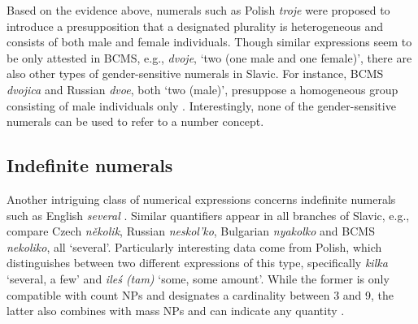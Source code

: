 \documentclass[output=paper]{langscibook}
\begin{document}
	\ea\label{ex:gender-polish} \label{ex:gender-polish-trzech}
	\label{ex:gender-polish-trzy}
	\label{ex:gender-polish-troje}
	\z
	\z

    \noindent Based on the evidence above, numerals such as Polish \textit{troje} were proposed to introduce a presupposition that a designated plurality is heterogeneous and consists of both male and female individuals. Though similar expressions seem to be only attested in BCMS, e.g., \textit{dvoje}, `two (one male and one female)', there are also other types of gender-sensitive numerals in Slavic. For instance, BCMS \textit{dvojica} and Russian \textit{dvoe}, both `two (male)', presuppose a homogeneous group consisting of male individuals only \citep{kim2009structure,lucic2015observations,khrizman2020cardinal}. Interestingly, none of the gender-sensitive numerals can be used to refer to a number concept.
	
	\subsection{Indefinite numerals}\label{sec:indefinite-numerals}
	
	Another intriguing class of numerical expressions concerns indefinite numerals such as English \textit{several} \citep{kayne2007several}. Similar quantifiers appear in all branches of Slavic, e.g., compare Czech \textit{několik}, Russian \textit{neskol'ko}, Bulgarian \textit{nyakolko} and BCMS \textit{nekoliko}, all `several'. Particularly interesting data come from Polish, which distinguishes between two different expressions of this type, specifically \textit{kilka} `several, a few' and \textit{ileś (tam)} `some, some amount'. While the former is only compatible with count NPs and designates a cardinality between 3 and 9, the latter also combines with mass NPs and can indicate any quantity \citep{wagiel2020several}. 
\end{document}
